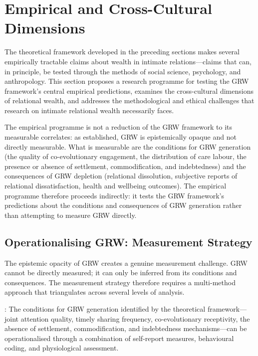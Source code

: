 \section{Empirical and Cross-Cultural Dimensions}
\label{p15:sec:empirical}

\noindent
The theoretical framework developed in the preceding sections makes several empirically tractable claims about wealth in intimate relations---claims that can, in principle, be tested through the methods of social science, psychology, and anthropology. This section proposes a research programme for testing the GRW framework's central empirical predictions, examines the cross-cultural dimensions of relational wealth, and addresses the methodological and ethical challenges that research on intimate relational wealth necessarily faces.

The empirical programme is not a reduction of the GRW framework to its measurable correlates: as  established, GRW is epistemically opaque and not directly measurable. What is measurable are the conditions for GRW generation (the quality of co-evolutionary engagement, the distribution of care labour, the presence or absence of settlement, commodification, and indebtedness) and the consequences of GRW depletion (relational dissolution, subjective reports of relational dissatisfaction, health and wellbeing outcomes). The empirical programme therefore proceeds indirectly: it tests the GRW framework's predictions about the conditions and consequences of GRW generation rather than attempting to measure GRW directly.

\subsection{Operationalising GRW: Measurement Strategy}
\label{p15:subsec:operationalising}

\noindent
The epistemic opacity of GRW creates a genuine measurement challenge. GRW cannot be directly measured; it can only be inferred from its conditions and consequences. The measurement strategy therefore requires a multi-method approach that triangulates across several levels of analysis.

: The conditions for GRW generation identified by the theoretical framework---joint attention quality, timely sharing frequency, co-evolutionary receptivity, the absence of settlement, commodification, and indebtedness mechanisms---can be operationalised through a combination of self-report measures, behavioural coding, and physiological assessment.

